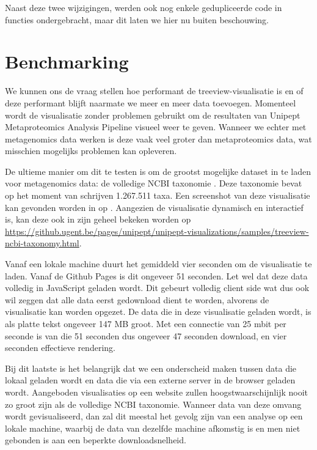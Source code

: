 Naast deze twee wijzigingen, werden ook nog enkele gedupliceerde code in 
functies 
ondergebracht, maar dit laten we hier nu buiten beschouwing.

\section{Benchmarking}
We kunnen ons de vraag stellen hoe performant de treeview-visualisatie is en of 
deze 
performant blijft naarmate we meer en meer data toevoegen. Momenteel 
wordt de visualisatie zonder problemen gebruikt om de resultaten van Unipept 
Metaproteomics Analysis Pipeline visueel weer te geven. Wanneer we echter met 
metagenomics data werken is 
deze vaak veel groter dan metaproteomics data, wat misschien mogelijks 
problemen kan opleveren.

De ultieme manier om dit te testen is om de grootst mogelijke dataset in te 
laden voor metagenomics data: de volledige NCBI taxonomie
\cite{ncbitaxonomy:online}.
Deze taxonomie bevat op het moment van schrijven 1.267.511 taxa. Een 
screenshot
van deze visualisatie kan gevonden worden in  op
. Aangezien de visualisatie dynamisch en interactief is,
kan deze ook in zijn geheel bekeken worden op
\url{https://github.ugent.be/pages/unipept/unipept-visualizations/samples/treeview-ncbi-taxonomy.html}.

Vanaf een lokale machine duurt het gemiddeld vier seconden om de visualisatie te
laden. Vanaf de Github Pages is dit ongeveer 51 seconden. Let wel dat deze data
volledig in JavaScript geladen wordt. Dit gebeurt volledig client side wat dus
ook wil zeggen dat alle data eerst gedownload dient te worden,
alvorens de visualisatie kan worden opgezet. De data die in deze visualisatie
geladen wordt, is als platte tekst ongeveer 147 MB groot. Met een connectie van
25 mbit per seconde is van die 51 seconden dus ongeveer 47 seconden download, en
vier seconden effectieve rendering.

Bij dit laatste is het belangrijk dat we een onderscheid maken tussen data die
lokaal geladen wordt en data die via een externe server in de browser geladen 
wordt.
Aangeboden visualisaties op een website zullen hoogstwaarschijnlijk nooit zo
groot zijn als de volledige NCBI taxonomie. Wanneer data van deze omvang wordt
gevisualiseerd, dan zal dit meestal het gevolg zijn van een analyse op een 
lokale
machine, waarbij de data van dezelfde machine afkomstig is en men niet gebonden
is aan een beperkte downloadsnelheid.

